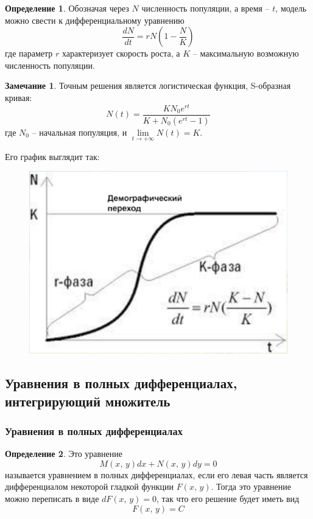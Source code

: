 \documentclass[a4paper,12pt]{article}
\theoremstyle{plain}
\theoremstyle{definition}
\newtheorem{definition}{Определение}[section]
\newtheorem*{note}{Замечание}
\theoremstyle{remark}
\begin{document}
\begin{definition}
	Обозначая через $N$ численность популяции, а время -- $t$, модель можно свести к дифференциальному уравнению
	\[\frac{dN}{dt} = rN\left(1 - \frac{N}{K}\right)\]
	где параметр $r$ характеризует скорость роста, а $K$ -- максимальную возможную численность популяции.
\end{definition}

\begin{note}
	Точным решения является логистическая функция, S-образная кривая:
	\[N(t) = \frac{KN_0e^{rt}}{K + N_0(e^{rt}-1)}\] где $N_0$ -- начальная популяция, и $\lim\limits_{t \to +\infty} N(t) = K$.

	Его график выглядит так:
	\begin{figure}[h]
		\includegraphics[scale=0.5]{img/ferh.png}
	\end{figure}
\end{note}

\subsection{Уравнения в полных дифференциалах, интегрирующий множитель}
\subsubsection*{Уравнения в полных дифференциалах}
\begin{definition}
	Это уравнение
	\[M(x,\,y)dx + N(x,\,y)dy = 0\]
	называется уравнением в полных дифференциалах, если его левая часть является дифференциалом некоторой гладкой функции $F(x,\,y)$. Тогда это уравнение можно переписать в виде $dF(x,\,y) = 0$, так что его решение будет иметь вид
	\[F(x,\,y) = C\]
\end{definition}
\end{document}
